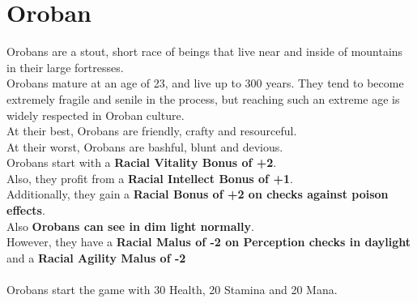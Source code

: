 \section{Oroban}\label{race:oroban}
Orobans are a stout, short race of beings that live near and inside of mountains in their large fortresses.\\
Orobans mature at an age of 23, and live up to 300 years.
They tend to become extremely fragile and senile in the process, but reaching such an extreme age is widely respected in Oroban culture.\\
At their best, Orobans are friendly, crafty and resourceful.\\
At their worst, Orobans are bashful, blunt and devious.\\
Orobans start with a \textbf{Racial Vitality Bonus of +2}.\\
Also, they profit from a \textbf{Racial Intellect Bonus of +1}.\\
Additionally, they gain a \textbf{Racial Bonus of +2 on checks against poison effects}.\\
Also \textbf{Orobans can see in dim light normally}.\\
However, they have a \textbf{Racial Malus of -2 on Perception checks in daylight} and a \textbf{Racial Agility Malus of -2}\\\\
Orobans start the game with 30 Health, 20 Stamina and 20 Mana.
